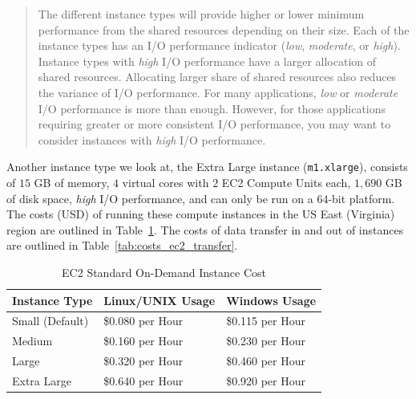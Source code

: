 \begin{quote}
  The different instance types will provide higher or lower minimum performance
  from the shared resources depending on their size. Each of the instance types
  has an I/O performance indicator (\emph{low}, \emph{moderate}, or
  \emph{high}). Instance types with \emph{high} I/O performance have a larger
  allocation of shared resources.  Allocating larger share of shared resources
  also reduces the variance of I/O performance. For many applications,
  \emph{low} or \emph{moderate} I/O performance is more than enough. However,
  for those applications requiring greater or more consistent I/O performance,
  you may want to consider instances with \emph{high} I/O performance.
\end{quote}

Another instance type we look at, the Extra Large instance ({\tt m1.xlarge}),
consists of $15$ GB of memory, $4$ virtual cores with $2$ EC2 Compute Units
each, $1,690$ GB of disk space, \emph{high} I/O performance, and can only be
run on a $64$-bit platform. The costs (USD) of running these compute instances
in the US East (Virginia) region are outlined in
Table~\ref{tab:costs_ec2_instance}. The costs of data transfer in and out of
instances are outlined in Table~\ref{tab:costs_ec2_transfer}.

\begin{table}[htp]
  \begin{center}
    \begin{tabular}{|l|l l|}
      \hline
      \multicolumn{1}{|c}{\textbf{Instance Type}} &
      \multicolumn{1}{|c}{\textbf{Linux/UNIX Usage}} & 
      \multicolumn{1}{c|}{\textbf{Windows Usage}}\\
      \hline
          Small (Default) & \$0.080 per Hour & \$0.115 per Hour\\
                   Medium & \$0.160 per Hour & \$0.230 per Hour\\
                    Large & \$0.320 per Hour & \$0.460 per Hour\\
              Extra Large & \$0.640 per Hour & \$0.920 per Hour\\
      \hline
    \end{tabular}
    \caption{EC2 Standard On-Demand Instance Cost}
    \label{tab:costs_ec2_instance}
  \end{center}
\end{table}

